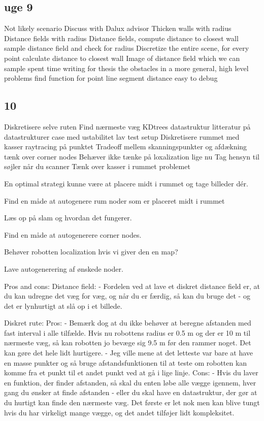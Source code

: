 \subsection{uge 9}
Not likely scenario 
Discuss with Dalux advisor 
Thicken walls with radius
Distance fields with radius
Distance fields, compute distance to closest wall
sample distance field and check for radius
Discretize the entire scene, for every point calculate distance to closest wall
Image of distance field which we can sample
spent time writing for thesis the obstacles in a more general, high level problems
find function for point line segment distance 
easy to debug

\subsection{10}
Diskretisere selve ruten
Find nærmeste væg 
KDtrees datastruktur 
litteratur på datastrukturer
case med ustabilitet
lav test setup
Diskretisere rummet med kasser
raytracing på punktet
Tradeoff mellem skanningspunkter og afdækning
tænk over corner nodes
Behæver ikke tænke på loxalization lige nu
Tag hensyn til søjler når du scanner 
Tænk over kasser i rummet problemet

En optimal strategi kunne være at placere midt i rummet og tage billeder dér.

Find en måde at autogenere rum noder som er placeret midt i rummet

Læs op på slam og hvordan det fungerer.

Find en måde at autogenerere corner nodes.

Behøver robotten localization hvis vi giver den en map?

Lave autogenerering af ønskede noder.

Pros and cons: 
Distance field:
- Fordelen ved at lave et diskret distance field er, at du kan udregne det væg for væg, og når du er færdig, så kan du bruge det - og det er lynhurtigt at slå op i et billede. 

Diskret rute:
Pros:
- Bemærk dog at du ikke behøver at beregne afstanden med fast interval i alle tilfælde. Hvis nu robottens radius er 0.5 m og der er 10 m til nærmeste væg, så kan robotten jo bevæge sig 9.5 m før den rammer noget. Det kan gøre det hele lidt hurtigere.
- Jeg ville mene at det letteste var bare at have en masse punkter og så bruge afstandsfunktionen til at teste om robotten kan komme fra et punkt til et andet punkt ved at gå i lige linje.
Cons:
- Hvis du laver en funktion, der finder afstanden, så skal du enten løbe alle vægge igennem, hver gang du ønsker at finde afstanden - eller du skal have en datastruktur, der gør at du hurtigt kan finde den nærmeste væg. Det første er let nok men kan blive tungt hvis du har virkeligt mange vægge, og det andet tilføjer lidt kompleksitet.



